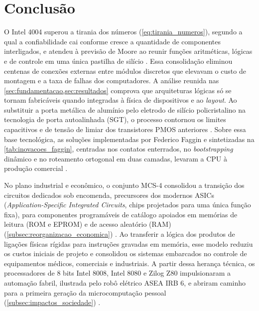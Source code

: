 
\section{Conclusão}
\label{sec:conclusao}

O Intel 4004 superou a tirania dos números (\cref{eq:tirania_numeros}), segundo a qual a confiabilidade cai conforme cresce a quantidade de componentes interligados, e atendeu à previsão de Moore ao reunir funções aritméticas, lógicas e de controle em uma única pastilha de silício \cite{morton1958, moore1965}. Essa consolidação eliminou centenas de conexões externas entre módulos discretos que elevavam o custo de montagem e a taxa de falhas dos computadores. A análise reunida nas \cref{sec:fundamentacao,sec:resultados} comprova que arquiteturas lógicas só se tornam fabricáveis quando integradas à física de dispositivos e ao \textit{layout}. Ao substituir a porta metálica de alumínio pelo eletrodo de silício policristalino na tecnologia de porta autoalinhada (SGT), o processo contornou os limites capacitivos e de tensão de limiar dos transistores PMOS anteriores \cite{faggin1970}. Sobre essa base tecnológica, as soluções implementadas por Federico Faggin e sintetizadas na \cref{tab:inovacoes_faggin}, centradas nos contatos enterrados, no \textit{bootstrapping} dinâmico e no roteamento ortogonal em duas camadas, levaram a CPU à produção comercial \cite{faggin1996, faggin2021}.

No plano industrial e econômico, o conjunto MCS-4 consolidou a transição dos circuitos dedicados sob encomenda, precursores dos modernos ASICs (\textit{Application-Specific Integrated Circuits}, chips projetados para uma única função fixa), para componentes programáveis de catálogo apoiados em memórias de leitura (ROM e EPROM) e de acesso aleatório (RAM) (\cref{subsec:reorganizacao_economica}) \cite{faggin1972fourchip}. Ao transferir a lógica dos produtos de ligações físicas rígidas para instruções gravadas em memória, esse modelo reduziu os custos iniciais de projeto e consolidou os sistemas embarcados no controle de equipamentos médicos, comerciais e industriais. A partir dessa herança técnica, os processadores de 8 bits Intel 8008, Intel 8080 e Zilog Z80 impulsionaram a automação fabril, ilustrada pelo robô elétrico ASEA IRB 6, e abriram caminho para a primeira geração da microcomputação pessoal (\cref{subsec:impactos_sociedade}) \cite{noyce1981, chmz80panel2007, bls1982futurework}.

